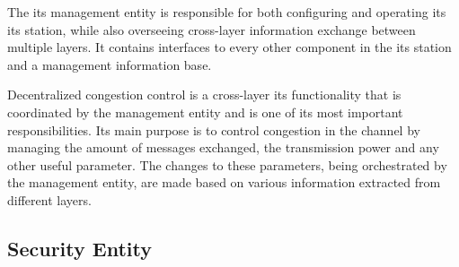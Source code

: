 The \gls{its} management entity is responsible for both configuring and operating its \gls{its} station, while also overseeing cross-layer information exchange between multiple layers. It contains interfaces to every other component in the \gls{its} station and a management information base. \cite{etsi_intelligent_2014}

Decentralized congestion control is a cross-layer \gls{its} functionality that is coordinated by the management entity and is one of its most important responsibilities. Its main purpose is to control congestion in the channel by managing the amount of messages exchanged, the transmission power and any other useful parameter. The changes to these parameters, being orchestrated by the management entity, are made based on various information extracted from different layers.
\cite{festag_cooperative_2014}


\subsection[Security Entity]{Security Entity}

